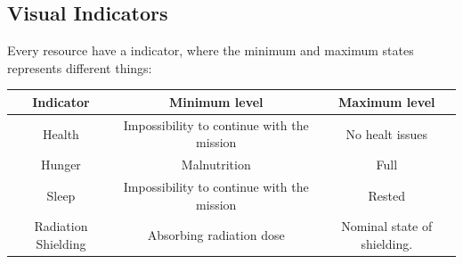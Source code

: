 \subsection{Visual Indicators}

Every resource have a indicator, where the minimum and maximum states represents different things: 

\begin{center}
\begin{tabular}{| c | c | c |}
    \hline
     \textbf{Indicator} & \textbf{Minimum level} & \textbf{Maximum level} \\
   
    \hline
    Health & Impossibility to continue with the mission & No healt issues \\
    \hline
    Hunger & Malnutrition & Full \\
    \hline
    Sleep & Impossibility to continue with the mission & Rested \\ 
    \hline
    Radiation Shielding & Absorbing radiation dose & Nominal state of shielding. \\ 
    \hline


\end{tabular}
\end{center}